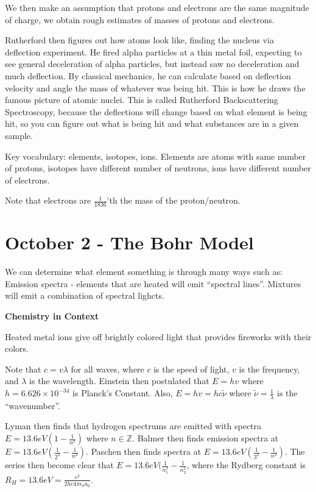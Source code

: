 \documentclass{report}
\begin{document}
We then make an assumption that protons and electrons are the same magnitude of charge, we obtain rough estimates of masses of protons and electrons. 

Rutherford then figures out how atoms look like, finding the nucleus via deflection experiment. He fired alpha particles at a thin metal foil, expecting to see general deceleration of alpha particles, but instead saw no deceleration and much deflection. By classical mechanics, he can calculate based on deflection velocity and angle the mass of whatever was being hit. This is how he draws the famous picture of atomic nuclei. This is called Rutherford Backscattering Spectroscopy, because the deflections will change based on what element is being hit, so you can figure out what is being hit and what substances are in a given sample.

Key vocabulary: elements, isotopes, ions. Elements are atoms with same number of protons, isotopes have different number of neutrons, ions have different number of electrons. 

Note that electrons are $\frac{1}{1836}$'th the mass of the proton/neutron. 

\chapter{October 2 - The Bohr Model}

We can determine what element something is through many ways such as: Emission spectra - elements that are heated will emit "`spectral lines"'. Mixtures will emit a combination of spectral lighcts. 

\begin{center}
\textbf{Chemistry in Context} 

Heated metal ions give off brightly colored light that provides fireworks with their colors.
\end{center}

Note that $c = v \lambda$ for all waves, where $c$ is the speed of light, $v$ is the frequency, and $\lambda$ is the wavelength. Einstein then postulated that $E = hv$ where $h = 6.626 \times 10^{-34}$ is Planck's Constant. Also, $E = hv = hc \tilde{\nu}$ where $\tilde{\nu} = \frac{1}{\lambda}$ is the "`wavenumber"'.

Lyman then finds that hydrogen spectrums are emitted with spectra $E = 13.6 eV(1-\frac{1}{n^2})$ where $n \in \mathbb{Z}$. Balmer then finds emission spectra at $E = 13.6 eV(\frac{1}{2^2}-\frac{1}{n^2})$. Paschen then finds spectra at $E = 13.6 eV(\frac{1}{3^2}-\frac{1}{n^2})$. The series then become clear that $E = 13.6 eV(\frac{1}{n_1^2}-\frac{1}{n_2^2}$, where the Rydberg constant is $R_H =13.6eV= \frac{e^2}{2hc4\pi \epsilon_0 a_0}$. 
\end{document}
